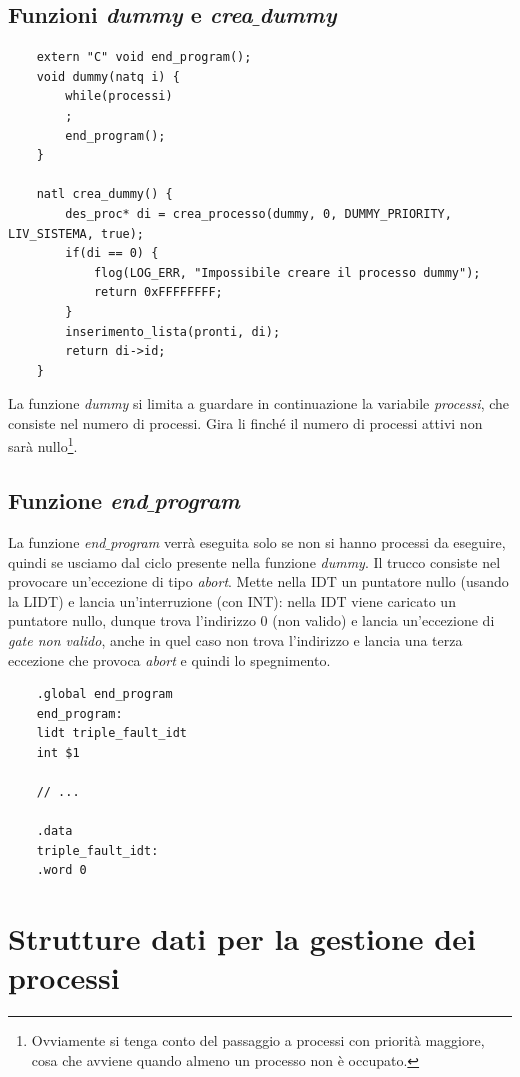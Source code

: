 \subsection{Funzioni \emph{dummy} e \emph{crea$\_$dummy}}
\small
\begin{verbatim}
	extern "C" void end_program();
	void dummy(natq i) {
		while(processi)
		;
		end_program();
	}
	
	natl crea_dummy() {
		des_proc* di = crea_processo(dummy, 0, DUMMY_PRIORITY, LIV_SISTEMA, true);
		if(di == 0) {
			flog(LOG_ERR, "Impossibile creare il processo dummy");
			return 0xFFFFFFFF;
		}
		inserimento_lista(pronti, di);
		return di->id;
	}
\end{verbatim}
\normalsize 
La funzione \emph{dummy} si limita a guardare in continuazione la variabile \emph{processi}, che consiste nel numero di processi. Gira li finché il numero di processi attivi non sarà nullo\footnote{Ovviamente si tenga conto del passaggio a processi con priorità maggiore, cosa che avviene quando almeno un processo non è occupato.}.

\subsection{Funzione \emph{end$\_$program}} 
La funzione \emph{end$\_$program} verrà eseguita solo se non si hanno processi da eseguire, quindi se usciamo dal ciclo presente nella funzione \emph{dummy}. Il trucco consiste nel provocare un'eccezione di tipo \emph{abort}. Mette nella IDT un puntatore nullo (usando la LIDT) e lancia un'interruzione (con INT): nella IDT viene caricato un puntatore nullo, dunque trova l'indirizzo $0$ (non valido) e lancia un'eccezione di \emph{gate non valido}, anche in quel caso non trova l'indirizzo e lancia una terza eccezione che provoca \emph{abort} e quindi lo spegnimento.
\begin{verbatim}
	.global end_program
	end_program: 
	lidt triple_fault_idt 
	int $1
	
	// ...
	
	.data 
	triple_fault_idt:
	.word 0
\end{verbatim}



\section{Strutture dati per la gestione dei processi}
